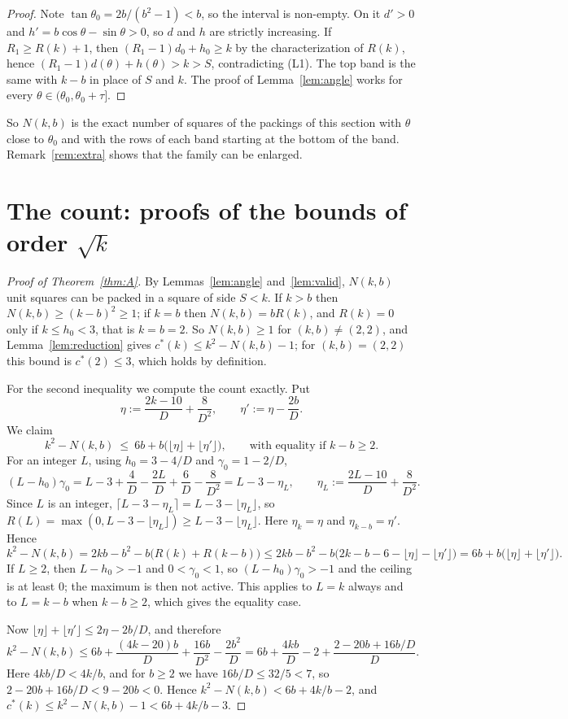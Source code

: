\documentclass[11pt]{amsart}
\newcommand{\cs}{c^{*}}
\theoremstyle{definition}
\theoremstyle{remark}
\numberwithin{equation}{section}
\begin{document}
\begin{proof}
Note $\tan\theta_0=2b/(b^2-1)<b$, so the interval is non-empty. On it $d'>0$ and $h'=b\cos\theta-\sin\theta>0$, so $d$ and
$h$ are strictly increasing. If $R_1\ge R(k)+1$, then $(R_1-1)d_0+h_0\ge k$ by the characterization of $R(k)$, hence
$(R_1-1)d(\theta)+h(\theta)>k>S$, contradicting (L1). The top band is the same with $k-b$ in place of $S$ and $k$. The
proof of Lemma~\ref{lem:angle} works for every $\theta\in(\theta_0,\theta_0+\tau]$.
\end{proof}

So $N(k,b)$ is the exact number of squares of the packings of this section with $\theta$ close to $\theta_0$ and with the
rows of each band starting at the bottom of the band. Remark~\ref{rem:extra} shows that the family can be enlarged.

\section{The count: proofs of the bounds of order \texorpdfstring{$\sqrt k$}{sqrt k}}\label{sec:count}

\begin{proof}[Proof of Theorem~\ref{thm:A}]
By Lemmas~\ref{lem:angle} and~\ref{lem:valid}, $N(k,b)$ unit squares can be packed in a square of side $S<k$. If $k>b$
then $N(k,b)\ge(k-b)^2\ge1$; if $k=b$ then $N(k,b)=bR(k)$, and $R(k)=0$ only if $k\le h_0<3$, that is $k=b=2$. So
$N(k,b)\ge1$ for $(k,b)\ne(2,2)$, and Lemma~\ref{lem:reduction} gives $\cs(k)\le k^2-N(k,b)-1$; for $(k,b)=(2,2)$ this
bound is $\cs(2)\le3$, which holds by definition.

For the second inequality we compute the count exactly. Put
\[
\eta:=\frac{2k-10}{D}+\frac{8}{D^2},\qquad \eta':=\eta-\frac{2b}{D}.
\]
We claim
\begin{equation}\label{eq:exact}
k^2-N(k,b)\ \le\ 6b+b\bigl(\lfloor\eta\rfloor+\lfloor\eta'\rfloor\bigr),\qquad\text{with equality if }k-b\ge2.
\end{equation}
For an integer $L$, using $h_0=3-4/D$ and $\gamma_0=1-2/D$,
\[
(L-h_0)\gamma_0=L-3+\frac4D-\frac{2L}{D}+\frac6D-\frac{8}{D^2}=L-3-\eta_L,\qquad \eta_L:=\frac{2L-10}{D}+\frac{8}{D^2}.
\]
Since $L$ is an integer, $\lceil L-3-\eta_L\rceil=L-3-\lfloor\eta_L\rfloor$, so
$R(L)=\max(0,L-3-\lfloor\eta_L\rfloor)\ge L-3-\lfloor\eta_L\rfloor$. Here $\eta_k=\eta$ and $\eta_{k-b}=\eta'$. Hence
\[
k^2-N(k,b)=2kb-b^2-b\bigl(R(k)+R(k-b)\bigr)\le2kb-b^2-b\bigl(2k-b-6-\lfloor\eta\rfloor-\lfloor\eta'\rfloor\bigr)
=6b+b\bigl(\lfloor\eta\rfloor+\lfloor\eta'\rfloor\bigr).
\]
If $L\ge2$, then $L-h_0>-1$ and $0<\gamma_0<1$, so $(L-h_0)\gamma_0>-1$ and the ceiling is at least $0$; the maximum is
then not active. This applies to $L=k$ always and to $L=k-b$ when $k-b\ge2$, which gives the equality case.

Now $\lfloor\eta\rfloor+\lfloor\eta'\rfloor\le2\eta-2b/D$, and therefore
\[
k^2-N(k,b)\le6b+\frac{(4k-20)b}{D}+\frac{16b}{D^2}-\frac{2b^2}{D}
=6b+\frac{4kb}{D}-2+\frac{2-20b+16b/D}{D}.
\]
Here $4kb/D<4k/b$, and for $b\ge2$ we have $16b/D\le32/5<7$, so $2-20b+16b/D<9-20b<0$. Hence
$k^2-N(k,b)<6b+4k/b-2$, and $\cs(k)\le k^2-N(k,b)-1<6b+4k/b-3$.
\end{proof}
\end{document}
